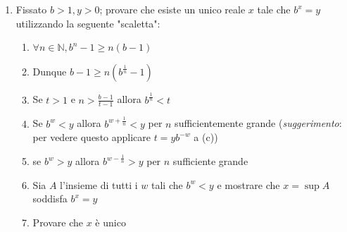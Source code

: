 \documentclass{report}
\begin{document}
\begin{enumerate}[resume, label=\protect\circled{\arabic*}]
	\item Fissato $b>1, y>0$; provare che esiste un unico reale $x$ tale che $b^x = y$ utilizzando la seguente "scaletta":
		\begin{enumerate}
			\item $\forall n \in \mathbb{N}, b^n - 1 \geq n(b-1)$
			\item Dunque $b-1 \geq n(b^{\frac{1}{n}}-1)$
			\item Se $t>1$ e $n > \frac{b-1}{t-1}$ allora $b^{\frac{1}{n}}<t$
			\item Se $b^w < y$ allora $b^{w+\frac{1}{n}} < y$ per $n$ sufficientemente grande (\emph{suggerimento}: per vedere questo applicare $t=yb^{-w}$ a (c))
			\item se $b^w > y$ allora $b^{w-\frac{1}{n}}>y$ per $n$ sufficiente grande
			\item Sia $A$ l'insieme di tutti i $w$ tali che $b^w < y$ e mostrare che $x=\sup{A}$ soddisfa $b^x = y$
			\item Provare che $x$ è unico
		\end{enumerate}	
\end{enumerate}
\end{document}
